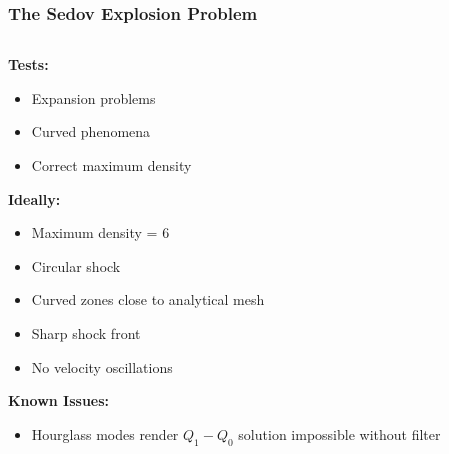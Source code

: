 \documentclass[8pt,xcolor=svgnames]{beamer}
\begin{document}

\begin{frame}
 \frametitle{The Sedov Explosion Problem}
\begin{columns}
 \begin{column}{0.3\textwidth}
\textbf{Tests:}
  \begin{itemize}
   \item Expansion problems
   \item Curved phenomena
   \item Correct maximum density
  \end{itemize}

\textbf{Ideally:}
\begin{itemize}
 \item Maximum density = 6
 \item Circular shock
 \item Curved zones close to analytical mesh
 \item Sharp shock front
 \item No velocity oscillations
\end{itemize}

\textbf{Known Issues:}
\begin{itemize}
 \item Hourglass modes render $Q_1-Q_0$ solution impossible without filter
\end{itemize}


\end{column}
\end{columns}
\end{frame}
\end{document}

